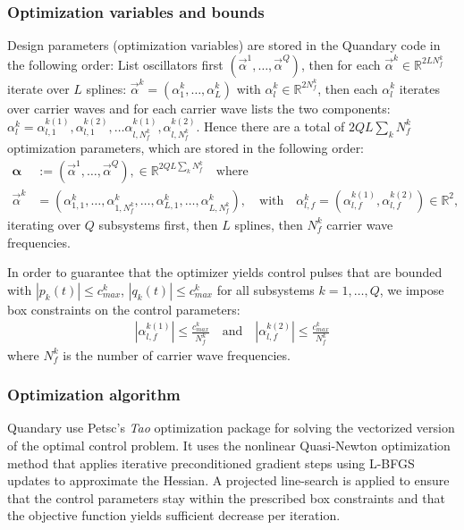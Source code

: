 \documentclass[11pt]{article}
\newcommand{\R}{\mathds{R}}
\begin{document}
\subsubsection{Optimization variables and bounds}

Design parameters (optimization variables) are stored in the Quandary code in the following order: List oscillators first $(\vec{\alpha}^1, \dots, \vec{\alpha}^Q)$, then for each $\vec{\alpha}^k \in
\R^{2LN_f^k}$ iterate over $L$ splines: $\vec{\alpha}^k =
(\alpha^k_1,\dots, \alpha^k_{L})$ with $\alpha^k_l \in \R^{2N_f^k}$, then each
$\alpha^k_l$ iterates over carrier waves and for each carrier wave lists
the two components: $\alpha^k_l = \alpha^{k(1)}_{l,1}, \alpha^{k(2)}_{l,1},
\dots \alpha^{k(1)}_{l,N_f^k}, \alpha^{k(2)}_{l,N_f^k}$. Hence there are a total of $2QL\sum_k N_f^k$ optimization parameters, which are stored in the following order:
  \begin{align}
    \boldsymbol{\alpha} &:= \left( \vec{\alpha}^1, \dots, \vec{\alpha}^Q \right), \in
    \mathds{R}^{2QL\sum_k N_f^k} \quad \text{where}\\
    \vec{\alpha}^k &= \left( \alpha_{1,1}^k,\dots, \alpha_{1,N_f^k}^k, \dots,
    \alpha_{L,1}^{k}, \dots, \alpha_{L,N_f^k}^k \right), \quad \text{with} \quad
    \alpha_{l,f}^k = \left(\alpha_{l,f}^{k(1)}, \alpha_{l,f}^{k(2)} \right) \in
    \R^2,
  \end{align}
  iterating over $Q$ subsystems first, then $L$ splines, then $N_f^k$ carrier wave
  frequencies. 

  In order to guarantee that the optimizer yields control pulses that are
  bounded with $|p_k(t)| \leq c^k_{max}$, $|q_k(t)| \leq c^k_{max}$ for all
  subsystems $k=1,\dots, Q$, we impose box constraints on the control
  parameters:
   \begin{align}
     | \alpha_{l,f}^{k(1)}| \leq \frac{c^k_{max}}{N_f^k} \quad \text{and} \quad |
     \alpha_{l,f}^{k(2)} | \leq \frac{c^k_{max}}{N_f^k}
   \end{align}
   where $N_f^k$ is the number of carrier wave frequencies.

  \subsubsection{Optimization algorithm}
    Quandary use Petsc's \textit{Tao} optimization package for solving
    the vectorized version of the optimal control problem. It uses the nonlinear Quasi-Newton
    optimization method that applies iterative preconditioned gradient steps using L-BFGS updates to approximate the Hessian. A projected line-search is applied to ensure that the control parameters stay within the prescribed box constraints and that the objective function yields sufficient decrease per iteration.
\end{document}
